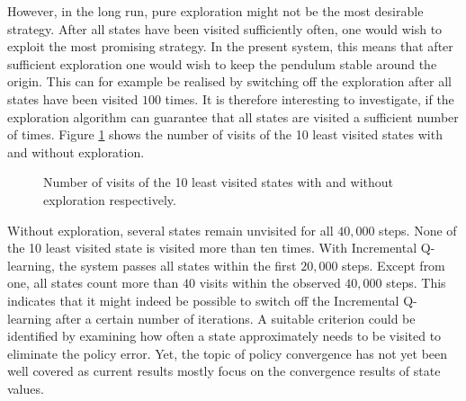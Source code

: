 \documentclass[../main.tex]{subfiles}
\begin{document}
However, in the long run, pure exploration might not be the most desirable strategy. After all states have been visited sufficiently often, one would wish to exploit the most promising strategy. In the present system, this means that after sufficient exploration one would wish to keep the pendulum stable around the origin. This can for example be realised by switching off the exploration after all states have been visited $100$ times. It is therefore interesting to investigate, if the exploration algorithm can guarantee that all states are visited a sufficient number of times. Figure \ref{fig:leastvisited} shows the number of visits of the 10 least visited states with and without exploration. 
\begin{figure}[H]
    \centering
        \caption{Number of visits of the 10 least visited states with and without exploration respectively.}  \label{fig:leastvisited}
\end{figure}
Without exploration, several states remain unvisited for all $40,000$ steps. None of the 10 least visited state is visited more than ten times. With Incremental Q-learning, the system passes all states within the first $20,000$ steps. Except from one, all states count more than $40$ visits within the observed $40,000$ steps. This indicates that it might indeed be possible to switch off the Incremental Q-learning after a certain number of iterations. A suitable criterion could be identified by examining how often a state approximately needs to be visited to eliminate the policy error. Yet, the topic of policy convergence has not yet been well covered as current results mostly focus on the convergence results of state values. \par
\end{document}
